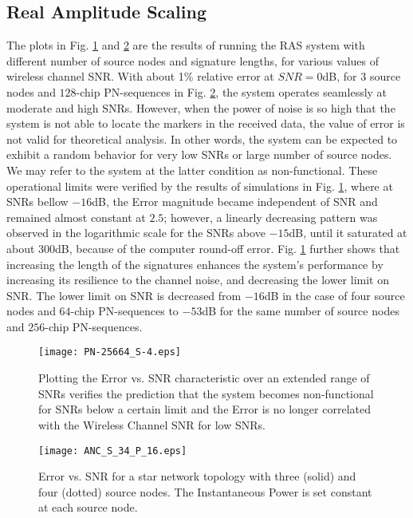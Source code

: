 \documentclass[conference]{IEEEtran}
\begin{document}
\subsection{Real Amplitude Scaling}\label{sim:RAS}
The plots in Fig. \ref{fig:S3} and \ref{fig:S2} are the results of running the RAS system with different number of source nodes and signature lengths, for various values of wireless channel SNR. 
With about 1\% relative error at $SNR=0$dB, for $3$ source nodes and $128$-chip PN-sequences in Fig. \ref{fig:S2}, the system operates seamlessly at moderate and high SNRs. However, when the power of noise is so high that the system is not able to locate the markers in the received data, the value of error is not valid for theoretical analysis. In other words, the system can be expected to exhibit a random behavior for very low SNRs or large number of source nodes. We may refer to the system at the latter condition as non-functional. These operational limits were verified by the results of simulations in Fig. \ref{fig:S3}, where at SNRs bellow $-16$dB, the Error magnitude became independent of SNR and remained almost constant at $2.5$; however, a linearly decreasing pattern was observed in the logarithmic scale for the SNRs above $-15$dB, until it saturated at about $300$dB, because of the computer round-off error. Fig. \ref{fig:S3} further shows that increasing the length of the signatures enhances the system's performance by increasing its resilience to the channel noise, and decreasing the lower limit on SNR. The lower limit on SNR is decreased from $-16$dB in the case of four source nodes and $64$-chip PN-sequences to $-53$dB for the same number of source nodes and $256$-chip PN-sequences.

\begin{figure}[tp]
     \centering

     \texttt{[image: PN-25664\_S-4.eps]}
     \caption{Plotting the Error vs. SNR characteristic over an extended range of SNRs verifies the prediction that the system becomes non-functional for SNRs below a certain limit and the Error is no longer correlated with the Wireless Channel SNR for low SNRs.}
     \label{fig:S3}
\end{figure}

\begin{figure}[tp]
     \centering
           \texttt{[image: ANC\_S\_34\_P\_16.eps]}

     \caption{Error vs. SNR  for a star network topology with three (solid) and four (dotted) source nodes.  The Instantaneous Power is set constant at each source node.}
     \label{fig:S2}
\end{figure}
\end{document}
